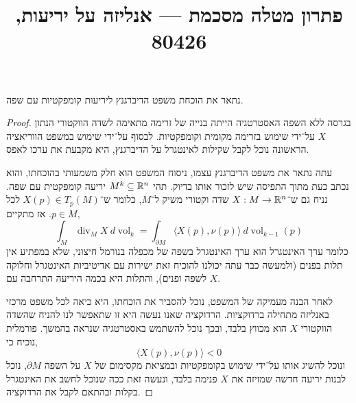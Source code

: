 
\title{פתרון מטלה מסכמת --- אנליזה על יריעות, 80426}

\DeclareMathOperator{\vol}{vol}
\DeclareMathOperator{\Div}{div}
\DeclareMathOperator{\curl}{curl}


\maketitle
\maketitleprint[blue]

\question{}
נתאר את הוכחת משפט הדיברגנץ ליריעות קומפקטיות עם שפה.
\begin{proof}
	בגרסה ללא השפה האסטרטגיה הייתה בנייה של זרימה מתאימה לשדה הווקטורי הנתון $X$ על־ידי שימוש בזרימה מקומית וקומפקטיות.
	לבסוף על־ידי שימוש במשפט הווריאציה הראשונה נוכל לקבל שקילות לאינטגרל על הדיברגנץ, היא מקבעת את ערכו לאפס.

	עתה נתאר את משפט הדיברגנץ עצמו, ניסוח המשפט הוא חלק משמעותי בהוכחתו, והוא נכתב כעת מתוך התפיסה שיש לזכור אותו בדיוק.
	תהי $M^k \subseteq \mathbb{R}^n$ יריעה קומפקטית עם שפה.
	נניח גם ש־$X : M \to \mathbb{R}^n$ שדה וקטורי משיק ל־$M$, כלומר ש־$X(p) \in T_p(M)$ לכל $p \in M$.
	אז מתקיים,
	\[
		\int_M \Div_M X\ d\vol_k
		= \int_{\partial M} \langle X(p), \nu(p) \rangle\ d\vol_{k - 1}(p)
	\]
	כלומר ערך האינטגרל הוא ערך האינטגרל בשפה של מכפלה בנורמל חיצוני, שלא במפתיע אין תלות בפנים (ולמעשה כבר עתה יכולנו להוכיח זאת ישירות עם אדיטיביות האינטגרל וחלוקה לשפה ופנים), והתלות היא בכמה היריעה התרחבה עם $X$.

	לאחר הבנה מעמיקה של המשפט, נוכל להסביר את הוכחתו, היא כיאה לכל משפט מרכזי באנליזה מתחילה ברדוקציות.
	הרדוקציה שאנו נעשה היא זו שתאפשר לנו להניח שהשדה הווקטורי $X$ הוא מכווץ בלבד, ובכך נוכל להשתמש באסטרטגיה שנראה בהמשך.
	פורמלית נוכיח כי,
	\[
		\langle X(p), \nu(p) \rangle < 0
	\]
	ונוכל להשיג אותו על־ידי שימוש בקומפקטיות ובמציאת מקסימום של $X$ על השפה $\partial M$, נוכל לבנות יריעה חדשה שמזיזה את $X$ פנימה בלבד, ונעשה זאת ככה שנוכל לחשב את האינטגרל בקלות ובהתאם לקבל את הרדוקציה.


\end{proof}
